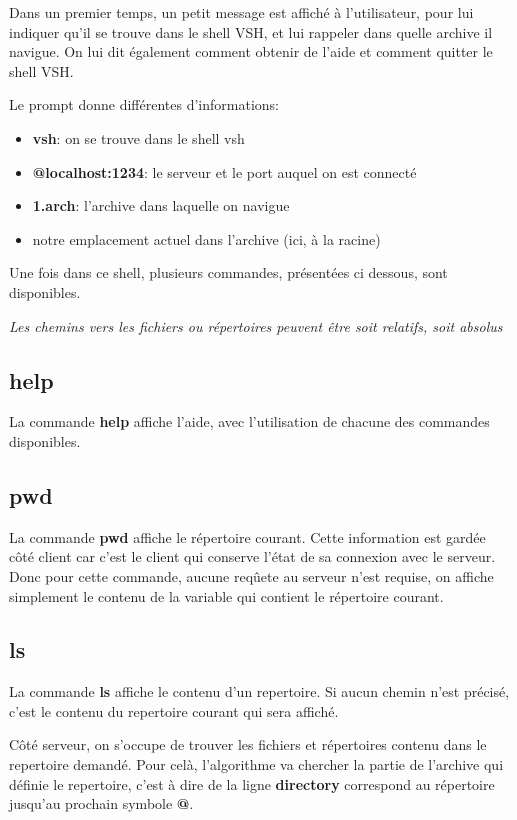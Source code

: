 \documentclass[titlepage]{article}
\begin{document}
	Dans un premier temps, un petit message est affiché à l'utilisateur, pour lui indiquer qu'il se trouve dans le shell VSH, et lui rappeler dans quelle archive il navigue. On lui dit également comment obtenir de l'aide et comment quitter le shell VSH.

	Le prompt donne différentes d'informations:
	\begin{itemize}  
		\item \textbf{vsh}: on se trouve dans le shell vsh
		\item \textbf{@localhost:1234}: le serveur et le port auquel on est connecté
		\item \textbf{{1.arch}}: l'archive dans laquelle on navigue
		\item notre emplacement actuel dans l'archive (ici, à la racine) 
	\end{itemize}

	Une fois dans ce shell, plusieurs commandes, présentées ci dessous, sont disponibles.

	\textit{Les chemins vers les fichiers ou répertoires peuvent être soit relatifs, soit absolus}

	\subsection{help}

	La commande \textbf{help} affiche l'aide, avec l'utilisation de chacune des commandes disponibles.

	\subsection{pwd}

	La commande \textbf{pwd} affiche le répertoire courant. Cette information est gardée côté client car c'est le client qui conserve l'état de sa connexion avec le serveur. Donc pour cette commande, aucune reqûete au serveur n'est requise, on affiche simplement le contenu de la variable qui contient le répertoire courant.

	\subsection{ls}

	La commande \textbf{ls} affiche le contenu d'un repertoire. Si aucun chemin n'est précisé, c'est le contenu du repertoire courant qui sera affiché.

	Côté serveur, on s'occupe de trouver les fichiers et répertoires contenu dans le repertoire demandé. Pour celà, l'algorithme va chercher la partie de l'archive qui définie le repertoire, c'est à dire de la ligne \textbf{directory} correspond au répertoire jusqu'au prochain symbole \textbf{@}. 
\end{document}
